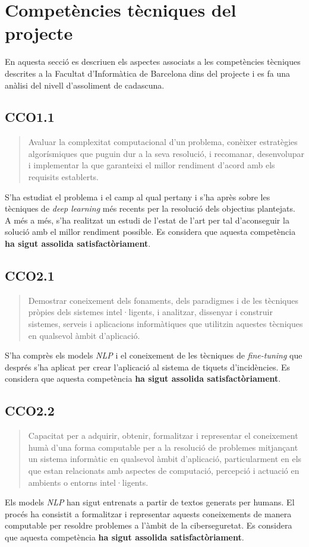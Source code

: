 \section{Competències tècniques del projecte}
En aquesta secció es descriuen els aspectes associats a les competències tècniques descrites a la Facultat d'Informàtica de Barcelona dins del projecte i es fa una anàlisi del nivell d'assoliment de cadascuna.

\subsection*{CCO1.1}
\begin{quote}
    Avaluar la complexitat computacional d'un problema, conèixer estratègies algorísmiques que puguin dur a la seva resolució, i recomanar, desenvolupar i implementar la que garanteixi el millor rendiment d'acord amb els requisits establerts.
\end{quote}
S'ha estudiat el problema i el camp al qual pertany i s'ha après sobre les tècniques de \textit{deep learning} més recents per la resolució dels objectius plantejats. A més a més, s'ha realitzat un estudi de l'estat de l'art per tal d'aconseguir la solució amb el millor rendiment possible. Es considera que aquesta competència \textbf{ha sigut assolida satisfactòriament}.

\subsection*{CCO2.1}
\begin{quote}
    Demostrar coneixement dels fonaments, dels paradigmes i de les tècniques pròpies dels sistemes intel·ligents, i analitzar, dissenyar i construir sistemes, serveis i aplicacions informàtiques que utilitzin aquestes tècniques en qualsevol àmbit d'aplicació.
\end{quote}
S'ha comprès els models \textit{NLP} i el coneixement de les tècniques de \textit{fine-tuning} que després s'ha aplicat per crear l'aplicació al sistema de tiquets d'incidències. Es considera que aquesta competència \textbf{ha sigut assolida satisfactòriament}.

\subsection*{CCO2.2}
\begin{quote}
    Capacitat per a adquirir, obtenir, formalitzar i representar el coneixement humà d'una forma computable per a la resolució de problemes mitjançant un sistema informàtic en qualsevol àmbit d'aplicació, particularment en els que estan relacionats amb aspectes de computació, percepció i actuació en ambients o entorns intel·ligents.
\end{quote}
Els models \textit{NLP} han sigut entrenats a partir de textos generats per humans. El procés ha consistit a formalitzar i representar aquests coneixements de manera computable per resoldre problemes a l'àmbit de la ciberseguretat. Es considera que aquesta competència \textbf{ha sigut assolida satisfactòriament}.


